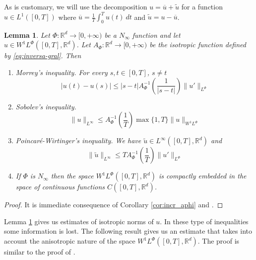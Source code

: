 \documentclass[twoside]{article}
\newtheorem{lem}[thm]{Lemma}
\theoremstyle{remark}
\newcommand{\orlnor}{\|_{L^{\Phi}}}
\newcommand{\linf}{\|_{L^{\infty}}}
\newcommand{\lphi}{L^{\Phi}}
\newcommand{\wphi}{W^{1}\lphi}
\newcommand{\sobnor}{\|_{W^{1}\lphi}}
\newcommand{\rr}{\mathbb{R}}
\renewcommand{\leq}{\leqslant}
\begin{document}
 As is customary, we will use the decomposition $u=\overline{u}+\widetilde{u}$ for a function $u\in L^1([0,T])$  where $\overline{u} =\frac1T\int_0^T u(t)\ dt$ and $\widetilde{u}=u-\overline{u}$.



\begin{lem}\label{lem:inclusion orlicz} Let $\Phi:\rr^d\to [0,+\infty)$ be a $N_{\infty}$
function and let \linebreak[4]$u\in\wphi\left([0,T],\rr^d\right)$. Let 
$A_{\Phi}: \rr^d \to  [0,+\infty)$ be the isotropic function defined by \eqref{eq:inversa-gral}. Then
 
\begin{enumerate}
  \item \emph{Morrey's inequality}.   For every $s,t\in [0,T]$, $s\neq t$
  \begin{equation}
   |u(t)-u(s)| \leq
  |s-t|A_{\Phi}^{-1}\left(\frac{1}{|s-t|}\right)\|u'\orlnor\tag{M.I}\label{in-sob-cont}
  \end{equation}

  \item \emph{Sobolev's inequality}. 
  \begin{equation}
   \|u\linf \leq A_\Phi^{-1}\left(\frac{1}{T}\right)\max\{1,T\}\|u\sobnor\tag{S.I}\label{eq:sobolev}
  \end{equation}

  \item \emph{Poincar\'e-Wirtinger's inequality}. We have $\widetilde{u}\in L^{\infty}\left([0,T],\rr^d\right)$ and 
    \begin{equation}\label{eq:wirtinger-iso}
    \|\widetilde{u}\|_{L^{\infty}} \leq T A_{\Phi}^{-1}\left(\frac{1}{T}\right)\| u'\orlnor\tag{P-W.I}
    \end{equation}
    
    \item\label{it:embeding} If $\Phi$ is $N_{\infty}$ then the space $\wphi\left([0,T],\rr^d\right)$ is compactly embedded in the space of  continuous functions $C([0,T],\rr^d)$.
  \end{enumerate}

\end{lem}

\begin{proof}  It is immediate consequence of Corollary \ref{cor:incr_aphi} and \cite[Lemma 2.1, Corollary 2.2]{ABGMS2015}.
\end{proof}

Lemma \ref{lem:inclusion orlicz} gives us estimates of isotropic norms of $u$. In these type of inequalities some information is lost.  The following result gives us an estimate that takes into account the anisotropic nature of the space $\wphi\left([0,T],\rr^d\right)$. The proof is similar to  the proof of  \cite[Th. 4.5]{chamra2017anisotropic}.
\end{document}

